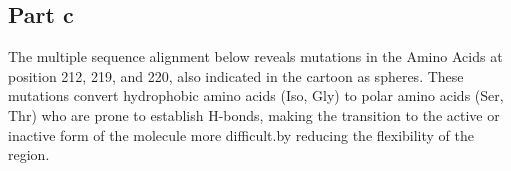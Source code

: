 \documentclass[11pt, a4paper,titlepage]{article}
\begin{document}
\subsection*{Part c}
The multiple sequence alignment below reveals mutations in the Amino
Acids at position 212, 219, and 220, also indicated in the cartoon as
spheres. These mutations convert hydrophobic amino acids (Iso, Gly) to
polar amino acids (Ser, Thr) who are prone to establish H-bonds,
making the transition to the active or inactive form of the molecule
more difficult.by reducing the flexibility of the region.

 
\end{document}
